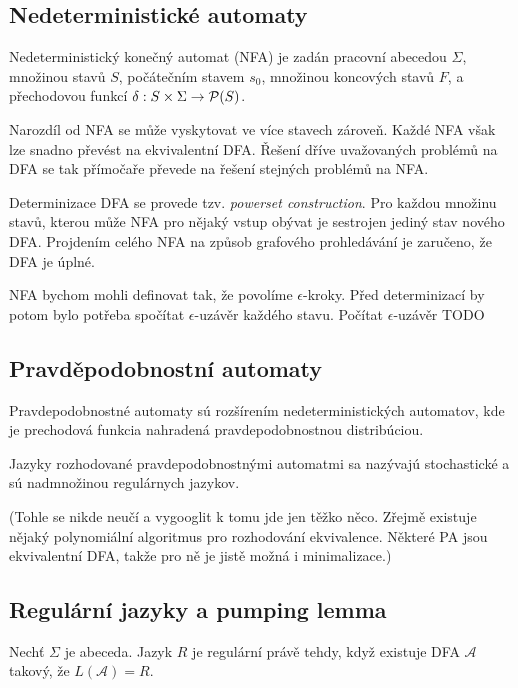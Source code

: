 \subsection{Nedeterministické automaty}

\begin{definition}
    Nedeterministický konečný automat (NFA) je zadán
    pracovní abecedou $\Sigma$,
    množinou stavů $S$,
    počátečním stavem $s_0$,
    množinou koncových stavů $F$,
    a přechodovou funkcí $\delta : S \times \Sigma \to \mathcal{P}(S)$.
\end{definition}

Narozdíl od NFA se může vyskytovat ve více stavech zároveň. Každé NFA
však lze snadno převést na ekvivalentní DFA. Řešení dříve uvažovaných
problémů na DFA se tak přímočaře převede na řešení stejných problémů na
NFA.

Determinizace DFA se provede tzv. {\em powerset construction}. Pro
každou množinu stavů, kterou může NFA pro nějaký vstup obývat je
sestrojen jediný stav nového DFA. Projdením celého NFA na způsob
grafového prohledávání je zaručeno, že DFA je úplné.

NFA bychom mohli definovat tak, že povolíme $\epsilon$-kroky. Před
determinizací by potom bylo potřeba spočítat $\epsilon$-uzávěr každého
stavu. Počítat $\epsilon$-uzávěr TODO

\subsection{Pravděpodobnostní automaty}

Pravdepodobnostné automaty sú rozšírením nedeterministických
automatov, kde je prechodová funkcia nahradená pravdepodobnostnou
distribúciou.

Jazyky rozhodované pravdepodobnostnými automatmi sa nazývajú stochastické
a sú nadmnožinou regulárnych jazykov.


(Tohle se nikde neučí a vygooglit k tomu jde jen těžko něco. Zřejmě
existuje nějaký polynomiální algoritmus pro rozhodování ekvivalence.
Některé PA jsou ekvivalentní DFA, takže pro ně je jistě možná i
minimalizace.)

\subsection{Regulární jazyky a pumping lemma}

\begin{definition}
Nechť $\Sigma$ je abeceda. Jazyk $R$ je regulární právě tehdy, když
existuje DFA $\mathcal{A}$ takový, že $L(\mathcal{A}) = R$.
\end{definition}

